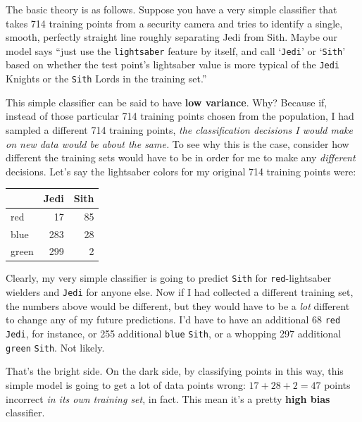 The basic theory is as follows. Suppose you have a very simple classifier that
takes 714 training points from a security camera and tries to identify a
single, smooth, perfectly straight line roughly separating Jedi from Sith.
Maybe our model says ``just use the \texttt{lightsaber} feature by itself, and
call `\texttt{Jedi}' or `\texttt{Sith}' based on whether the test point's
lightsaber value is more typical of the \texttt{Jedi} Knights or the
\texttt{Sith} Lords in the training set.''

This simple classifier can be said to have \textbf{low variance}. Why? Because
if, instead of those particular 714 training points chosen from the
population, I had sampled a different 714 training points, \textit{the
classification decisions I would make on new data would be about the same.} To
see why this is the case, consider how different the training sets would have
to be in order for me to make any \textit{different} decisions. Let's say the
lightsaber colors for my original 714 training points were:

\label{simpleClassifierTable}
\Large
\begin{center}
\begin{tabular}{|l|rr|}
\hline
& Jedi & Sith \\
\hline
red & 17 & 85 \\
blue & 283 & 28 \\
green & 299 & 2 \\
\hline
\end{tabular}
\end{center}
\normalsize

Clearly, my very simple classifier is going to predict \texttt{Sith} for
\texttt{red}-lightsaber wielders and \texttt{Jedi} for anyone else. Now if I
had collected a different training set, the numbers above would be different,
but they would have to be a \textit{lot} different to change any of my future
predictions. I'd have to have an additional 68 \texttt{red} \texttt{Jedi}, for
instance, or 255 additional \texttt{blue} \texttt{Sith}, or a whopping 297
additional \texttt{green} \texttt{Sith}. Not likely.

That's the bright side. On the dark side, by classifying points in this way,
this simple model is going to get a lot of data points wrong: $17+28+2=47$
points incorrect \textit{in its own training set}, in fact. This mean it's a
pretty \textbf{high bias} classifier.

